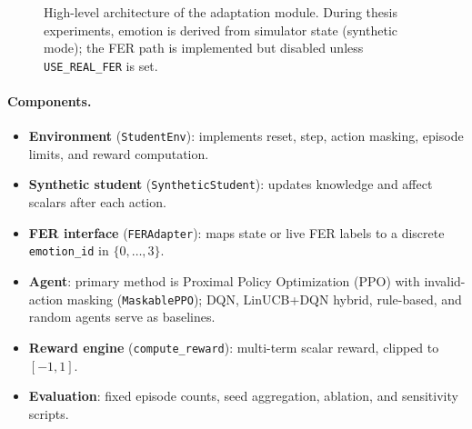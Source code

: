 \begin{figure}[H]
    \centering
    \caption{High-level architecture of the adaptation module. During thesis experiments, emotion is derived from simulator state (synthetic mode); the FER path is implemented but disabled unless \texttt{USE\_REAL\_FER} is set.}
    \label{fig:rl_architecture}
\end{figure}

\paragraph{Components.}
\begin{itemize}
    \item \textbf{Environment} (\texttt{StudentEnv}): implements reset, step, action masking, episode limits, and reward computation.
    \item \textbf{Synthetic student} (\texttt{SyntheticStudent}): updates knowledge and affect scalars after each action.
    \item \textbf{FER interface} (\texttt{FERAdapter}): maps state or live FER labels to a discrete \texttt{emotion\_id} in $\{0,\ldots,3\}$.
    \item \textbf{Agent}: primary method is Proximal Policy Optimization (PPO) with invalid-action masking (\texttt{MaskablePPO}); DQN, LinUCB+DQN hybrid, rule-based, and random agents serve as baselines.
    \item \textbf{Reward engine} (\texttt{compute\_reward}): multi-term scalar reward, clipped to $[-1,1]$.
    \item \textbf{Evaluation}: fixed episode counts, seed aggregation, ablation, and sensitivity scripts.
\end{itemize}

